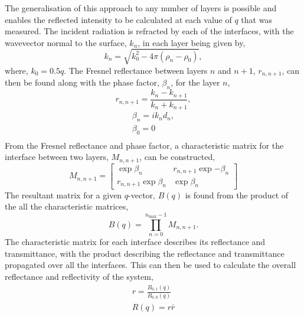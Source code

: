 \documentclass[
 reprint,
 superscriptaddress,
 amsmath,amssymb,
 aps,
]{revtex4-1}
\begin{document}
The generalisation of this approach to any number of layers is possible and enables the reflected intensity to be calculated at each value of $q$ that was measured.
The incident radiation is refracted by each of the interfaces, with the wavevector normal to the surface, $k_n$, in each layer being given by,
%
\begin{equation}
    k_n = \sqrt{k_0^2 - 4\pi(\rho_n - \rho_0)},
\end{equation}
%
where, $k_0 = 0.5q$.
The Fresnel reflectance between layers $n$ and $n+1$, $r_{n, n+1}$, can then be found along with the phase factor, $\beta_n$, for the layer $n$,
%
\begin{equation}
    r_{n, n+1} = \frac{k_n - k_{n+1}}{k_n + k_{n+1}},
    \label{equ:fres}
\end{equation}
%
%
\begin{equation}
\begin{aligned}
\beta_n = ik_nd_n, \\
\beta_0 = 0 \\
\end{aligned}
\end{equation}
%
From the Fresnel reflectance and phase factor, a characteristic matrix for the interface between two layers, $M_{n, n+1}$, can be constructed,
%
\begin{equation}
    M_{n, n+1} =
    \begin{bmatrix}
        \exp{\beta_n} & r_{n,n+1}\exp{-\beta_n} \\
        r_{n,n+1}\exp{\beta_n} & \exp{\beta_n}
    \end{bmatrix}
\end{equation}
%
The resultant matrix for a given $q$-vector, $B(q)$ is found from the product of the all the characteristic matrices,
%
\begin{equation}
    B(q) = \prod_{n=0}^{n_{\text{max}}-1}{M_{n, n+1}}.
\end{equation}
The characteristic matrix for each interface describes its reflectance and transmittance, with the product describing the reflectance and transmittance propagated over all the interfaces. This can then be used to calculate the overall reflectance and reflectivity of the system,
%
\begin{equation}
\begin{aligned}
    r =  \frac{B_{0,1}(q)}{B_{0,0}(q)} \\
    R(q) = r\bar r
\end{aligned}
\end{equation}
%
\end{document}
